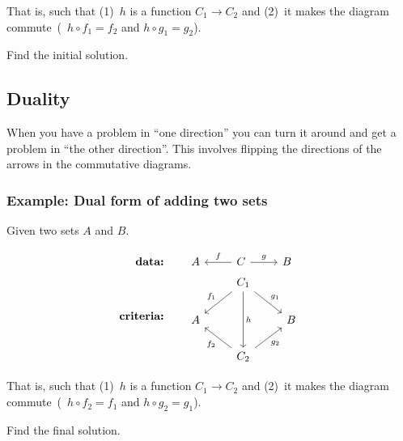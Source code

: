    That is, such that (1)~$h$ is a function $C_1 \rightarrow C_2$ and (2)~it
    makes the diagram commute~(\ie~$h \circ f_1 = f_2$ and $h \circ g_1 = g_2$).
    
    \begin{exercise}
        Find the initial solution. \label{ex:addsets}
    \end{exercise}
    
    \subsection{Duality}
    
    When you have a problem in ``one direction'' you can turn it around and get a
    problem in ``the other direction''. This involves flipping the directions of
    the arrows in the commutative diagrams.
    
    \subsubsection*{Example: Dual form of adding two sets}
    
    Given two sets $A$ and $B$.
    
    \begin{align*}
         \textbf{data:}\qquad & \begin{tikzcd}[ampersand replacement=\&]
                A \& C \arrow[l, swap, "f"] \arrow[r, "g"] \& B
            \end{tikzcd} \\
        \textbf{criteria:}\qquad & \begin{tikzcd}[ampersand replacement=\&]
              {} \& C_1 \arrow[dd, "h"] \arrow[ld, swap, "f_1"] \arrow[rd, "g_1"]
              \& {} \\ A \& {} \& B \\
              {} \& C_2 \arrow[lu, "f_2"] \arrow[ru, swap, "g_2"] \& {}
          \end{tikzcd}
    \end{align*}
    
    
    
    That is, such that (1)~$h$ is a function $C_1 \rightarrow C_2$ and (2)~it
    makes the diagram commute~(\ie~$h \circ f_2 = f_1$ and $h \circ g_2 = g_1$).
    
    \begin{exercise}
        Find the final solution. \label{ex:dual}
    \end{exercise}
    
